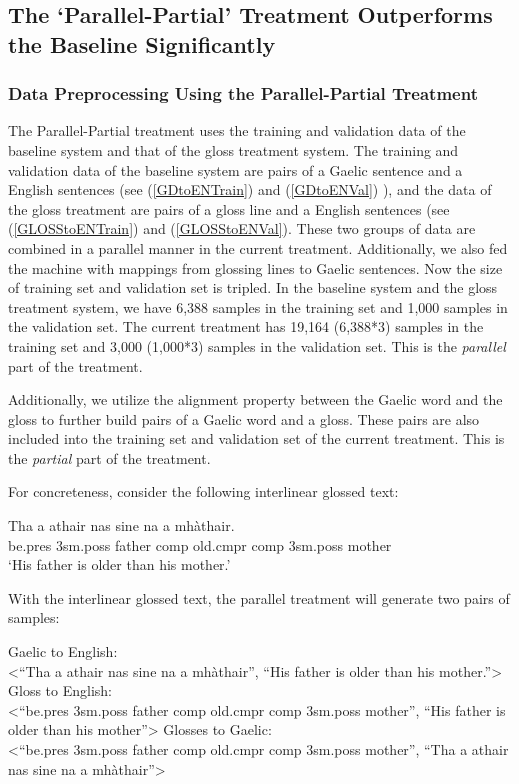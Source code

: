 \documentclass[11pt,a4paper]{article}
\begin{document}
\subsection{The `Parallel-Partial' Treatment Outperforms the Baseline Significantly}

\subsubsection{Data Preprocessing Using the Parallel-Partial Treatment}
The Parallel-Partial treatment uses the training and validation data of the baseline system and that of the gloss treatment system.  
The training and validation data of the baseline system are pairs of a Gaelic sentence and a English sentences (see (\ref{GDtoENTrain}) and (\ref{GDtoENVal}) ), 
and the data of the gloss treatment are pairs of a gloss line and a English sentences (see (\ref{GLOSStoENTrain}) and (\ref{GLOSStoENVal}). 
These two groups of data are combined in a parallel manner in the current treatment. Additionally, we also fed the machine with mappings from glossing lines to Gaelic sentences. Now the size of training set and validation set is tripled. In the baseline system and the gloss treatment system, we have 6,388 samples in the training set and 1,000 samples in the validation set. The current treatment has 19,164 (6,388*3) samples in the training set and 3,000 (1,000*3) samples in the validation set. This is the \textit{parallel} part of the treatment. 

Additionally, we utilize the alignment property between the Gaelic word and the gloss to further build pairs of a Gaelic word and a gloss. These pairs are also included into the training set and validation set of the current treatment. This is the \textit{partial} part of the treatment. 

For concreteness, consider the following interlinear glossed text: 
\begin{exe}  
\ex \gll    Tha a athair nas sine na a mh\`athair.\\  
            be.pres 3sm.poss father comp old.cmpr comp 3sm.poss mother\\  
    \glt    `His father is older than his mother.'  
\end{exe}

With the interlinear glossed text, the parallel treatment will generate two pairs of samples:

\begin{exe}
	\ex \label{21}
	\begin{xlist}
		\ex Gaelic to English: \\<``Tha a athair nas sine na a mh\`athair'', ``His father is older than his mother.''>
		\ex Gloss to English: \\<``be.pres 3sm.poss father comp old.cmpr comp 3sm.poss mother'', ``His father is older than his mother''>
		\ex Glosses to Gaelic: \\<``be.pres 3sm.poss father comp old.cmpr comp 3sm.poss mother'', ``Tha a athair nas sine na a mh\`athair''>
	\end{xlist}
\end{exe}
\end{document}
